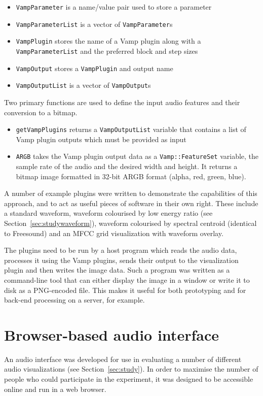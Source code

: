 {\singlespacing
\begin{itemize}
  \item \texttt{VampParameter} is a name/value pair used to store a parameter
  \item \texttt{VampParameterList} is a vector of \texttt{VampParameter}s
  \item \texttt{VampPlugin} stores the name of a Vamp plugin along with a\\
    \texttt{VampParameterList} and the preferred block and step sizes
  \item \texttt{VampOutput} stores a \texttt{VampPlugin} and output name
  \item \texttt{VampOutputList} is a vector of \texttt{VampOutput}s
\end{itemize}
}

Two primary functions are used to define the input audio features and their
conversion to a bitmap.

\begin{itemize}
  \item \texttt{getVampPlugins} returns a \texttt{VampOutputList} variable
    that contains a list of Vamp plugin outputs which must be provided as
    input
  \item \texttt{ARGB} takes the Vamp plugin output data as a
    \texttt{Vamp::FeatureSet} variable, the sample rate of the audio and the
    desired width and height. It returns a bitmap image formatted in 32-bit
    ARGB format (alpha, red, green, blue).
\end{itemize}

A number of example plugins were written to demonstrate the capabilities of
this approach, and to act as useful pieces of software in their own right.
These include a standard waveform, waveform colourised by low energy ratio (see
Section~\ref{sec:studywaveform}), waveform colourised by spectral centroid
(identical to Freesound) and an MFCC grid visualization with waveform overlay.

The plugins need to be run by a host program which reads the audio data,
processes it using the Vamp plugins, sends their output to the visualization
plugin and then writes the image data. Such a program was written as a
command-line tool that can either display the image in a window or write it to
disk as a PNG-encoded file. This makes it useful for both prototyping and for
back-end processing on a server, for example.

\section{Browser-based audio interface}\label{sec:iface}
An audio interface was developed for use in evaluating a number of different
audio visualizations (see Section~\ref{sec:study}). In order to maximise the
number of people who could participate in the experiment, it was designed to be
accessible online and run in a web browser.

